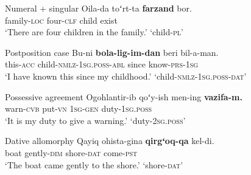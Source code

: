 \begin{exe}
\ex\label{ex:numeral_no_plural} Numeral + singular
\gll Oila-da toʻrt-ta \textbf{farzand} bor.\\
family-\textsc{loc} four-\textsc{clf} child exist\\
\glt `There are four children in the family.' \hfill {} `child-\textsc{pl}'
\end{exe}
\begin{exe}
\ex\label{ex:postposition_case} Postposition case
\gll Bu-ni \textbf{bola-lig-im-dan} beri bil-a-man.\\
this-\textsc{acc} child-\textsc{nmlz}-\textsc{1sg}.\textsc{poss}-\textsc{abl} since know-\textsc{prs}-\textsc{1sg}\\
\glt `I have known this since my childhood.' \hfill {} `child-\textsc{nmlz}-\textsc{1sg}.\textsc{poss}-\textsc{dat}'
\end{exe}
\begin{exe}
\ex\label{ex:possessive_agreement} Possessive agreement
\gll Ogohlantir-ib qoʻy-ish men-ing \textbf{vazifa-m.}\\
warn-\textsc{cvb} put-\textsc{vn} \textsc{1sg}-\textsc{gen} duty-\textsc{1sg}.\textsc{poss}\\
\glt `It is my duty to give a warning.' \hfill {} `duty-\textsc{2sg}.\textsc{poss}'
\end{exe}
\begin{exe}
\ex\label{ex:dative_allomorphy} Dative allomorphy
\gll Qayiq ohista-gina \textbf{qirgʻoq-qa} kel-di.\\
boat gently-\textsc{dim} shore-\textsc{dat} come-\textsc{pst}\\
\glt `The boat came gently to the shore.' \hfill {} `shore-\textsc{dat}'
\end{exe}
